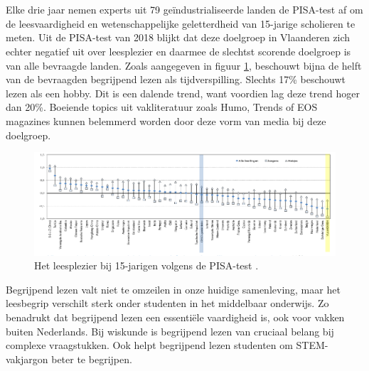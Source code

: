 \section{}%
\label{sec:probleemstelling}

Elke drie jaar nemen experts uit 79 geïndustrialiseerde landen de PISA-test af om de leesvaardigheid en wetenschappelijke geletterdheid van 15-jarige scholieren te meten. Uit de PISA-test van 2018 blijkt dat deze doelgroep in Vlaanderen zich echter negatief uit over leesplezier en daarmee de slechtst scorende doelgroep is van alle bevraagde landen. Zoals aangegeven in figuur \ref{img:oeso-leesplezier}, beschouwt bijna de helft van de bevraagden begrijpend lezen als tijdverspilling. Slechts 17\% beschouwt lezen als een hobby. Dit is een dalende trend, want voordien lag deze trend hoger dan 20\%. Boeiende topics uit vakliteratuur zoals Humo, Trends of EOS magazines kunnen belemmerd worden door deze vorm van media bij deze doelgroep.

\begin{figure}[H]
	\begin{center}
		\includegraphics[width=\linewidth]{img/oeso-graphic-leesplezier.png}
	\end{center}
	\caption{Het leesplezier bij 15-jarigen volgens de PISA-test \autocite{DeMeyer2019}.}
	\label{img:oeso-leesplezier}
\end{figure}

\medspace

Begrijpend lezen valt niet te omzeilen in onze huidige samenleving, maar het leesbegrip verschilt sterk onder studenten in het middelbaar onderwijs. Zo benadrukt \textcite{Vlaanderen2020} dat begrijpend lezen een essentiële vaardigheid is, ook voor vakken buiten Nederlands. Bij wiskunde is begrijpend lezen van cruciaal belang bij complexe vraagstukken. Ook helpt begrijpend lezen studenten om STEM-vakjargon beter te begrijpen.

\medspace 

